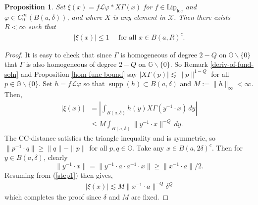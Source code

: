 \documentclass[12pt,a4paper,reqno]{amsart}
\DeclareMathOperator{\supp}{supp}
\newcommand{\cg}{\Gamma}
\renewcommand{\L}{\mathcal{L}}
\newcommand{\G}{\mathbb{G}}
\numberwithin{equation}{section}
\newtheorem{prop}[thm]{Proposition}
\theoremstyle{definition}
\begin{document}
\begin{prop}\label{decay-of-one-deriv}
 Set $\xi(x) = f \L \varphi \ast X\cg(x)$ for $f \in \text{Lip}_{\text{loc}}$ and $\varphi \in C_0^{\infty}(B(a,\delta))$, and where $X$ is any element in $\mathcal{X}$. Then there exists $R < \infty$ such that \begin{align*}
     |\xi(x)|\leq 1 \quad \text{ for all }x\in B(a,R)^c.
 \end{align*}  
\end{prop}
\begin{proof}
It is easy to check that since $\cg$ is homogeneous of degree $2-Q$ on $\G \backslash \{0\}$ that $\cg$ is also homogeneous of degree $2-Q$ on $\G \backslash \{0\}$. So Remark \ref{deriv-of-fund-soln} and Proposition \ref{hom-func-bound} say $|X \cg(p)|\lesssim \| p\|^{1-Q}$ for all $p \in \G \backslash \{0\}$. Set $h = f \L \varphi$ so that $\supp (h) \subset B(a,\delta)$ and $M := \| h\|_{\infty} < \infty$. Then,  \begin{align}
    |\xi(x)| &= \left| \int_{B(a,\delta)}h(y) X\cg(y^{-1}\cdot x)\,dy\right| \nonumber \\ &\leq M \int_{B(a,\delta)}\| y^{-1}\cdot x\|^{-Q}\,dy. \label{step1}
\end{align}
The CC-distance satisfies the triangle inequality and is symmetric, so $\| p^{-1}\cdot q\| \geq \| q\| -\|p\|$ for all $p,q \in \G$. Take any $x \in B(a,2\delta)^c$. Then for $y \in B(a,\delta)$, clearly $$\| y^{-1}\cdot x\| = \| y^{-1}\cdot a \cdot a^{-1}\cdot x\| \geq \|x^{-1}\cdot a\|/2.$$ Resuming from (\ref{step1}) then gives, \begin{align*}
|\xi(x)| \lesssim M \|x^{-1}\cdot a\|^{-Q} \delta^Q
\end{align*}
which completes the proof since $\delta$ and $M$ are fixed.
\end{proof}
\end{document}
